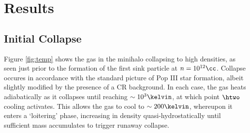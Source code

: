 \section{Results}
\label{sec:results}
\subsection{Initial Collapse}
\label{sec:initial_collapse}

Figure \ref{fig:temp} shows the gas in the minihalo collapsing to high densities, as seen just prior to the formation of the first sink particle at $n=10^{12}\cc$.  Collapse occures in accordance with the standard picture of Pop III star formation, albeit slightly modified by the presence of a CR background.  In each case, the gas heats adiabatically as it collapses until reaching $\sim10^3\kelvin$, at which point $\htwo$ cooling activates.  This allows the gas to cool to $\sim200\kelvin$, whereupon it enters a `loitering' phase, increasing in density quasi-hydrostatically until sufficient mass accumulates to trigger runaway collapse.
